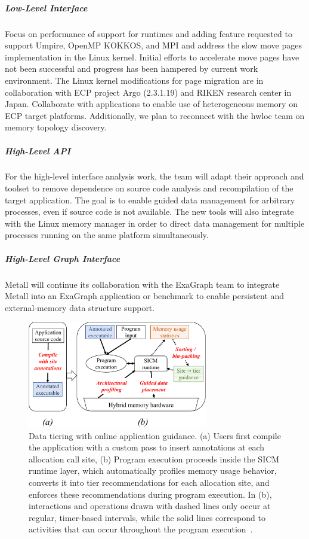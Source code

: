 \subparagraph{Low-Level Interface} Focus on performance of support for runtimes and adding feature requested to support Umpire, OpenMP KOKKOS, and MPI and address the slow move pages implementation in the Linux kernel. Initial efforts to accelerate move pages have not been successful and progress has been hampered by current work environment. The Linux kernel modifications for page migration are in collaboration with ECP project Argo (2.3.1.19) and RIKEN research center in Japan. Collaborate with applications to enable use of heterogeneous memory on ECP target platforms. Additionally, we plan to reconnect with the hwloc team on memory topology discovery.
\subparagraph{High-Level API} For the high-level interface analysis work, the team will adapt their approach and toolset to remove dependence on source code analysis and recompilation of the target application. The goal is to enable guided data management for arbitrary processes, even if source code is not available. The new tools will also integrate with the Linux memory manager in order to direct data management for multiple processes running on the same platform simultaneously.
\subparagraph{High-Level Graph Interface} Metall will continue its collaboration with the ExaGraph team to integrate Metall into an ExaGraph application or benchmark to enable persistent and external-memory data structure support.   

\begin{figure}[htb]
	\centering
	\includegraphics[width=0.7\textwidth]{projects/2.3.1-PMR/2.3.1.16-SICM/sicm-online-diagram.pdf}
	\caption{
		Data tiering with online application guidance. (a) Users first compile the application with a custom pass to insert annotations at each allocation call site, (b) Program execution proceeds inside the SICM runtime layer, which automatically profiles memory usage behavior, converts it into tier recommendations for each allocation site, and enforces these recommendations during program execution. In (b), interactions and operations drawn with dashed lines only occur at regular, timer-based intervals, while the solid lines correspond to activities that can occur throughout the program execution~\cite{olson2021online}.
		\label{fig:sicm-online}
	}
\end{figure}
